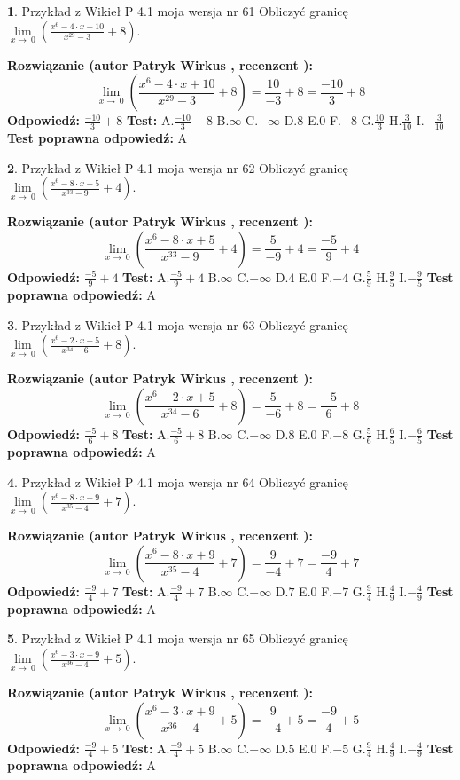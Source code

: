 \documentclass[12pt, a4paper]{article}
\theoremstyle{definition} %
\newtheorem{zad}{}
\newcommand{\zadStart}[1]{\begin{zad}#1\newline}
\newcommand{\zadStop}{\end{zad}}
\newcommand{\rozwStart}[2]{\noindent \textbf{Rozwiązanie (autor #1 , recenzent #2): }\newline}
\newcommand{\rozwStop}{\newline}
\newcommand{\odpStart}{\noindent \textbf{Odpowiedź:}\newline}
\newcommand{\odpStop}{\newline}
\newcommand{\testStart}{\noindent \textbf{Test:}\newline}
\newcommand{\testStop}{\newline}
\newcommand{\kluczStart}{\noindent \textbf{Test poprawna odpowiedź:}\newline}
\newcommand{\kluczStop}{\newline}
\begin{document}
\zadStart{Przykład z Wikieł P 4.1 moja wersja nr 61}
Obliczyć granicę $\lim\limits_{x\to\ 0}(\frac{x^{6}-4 \cdot x +10}{x^{29}-3}+8)$.
\zadStop
\rozwStart{Patryk Wirkus}{}
$$\lim\limits_{x\to\ 0}(\frac{x^{6}-4 \cdot x +10}{x^{29}-3}+8)=\frac{10}{-3}+8=\frac{-10}{3}+8$$
\rozwStop
\odpStart
$\frac{-10}{3}+8$
\odpStop
\testStart
A.$\frac{-10}{3}+8$
B.$\infty$
C.$-\infty$
D.$8$
E.$0$
F.$-8$
G.$\frac{10}{3}$
H.$\frac{3}{10}$
I.$-\frac{3}{10}$
\testStop
\kluczStart
A
\kluczStop



\zadStart{Przykład z Wikieł P 4.1 moja wersja nr 62}
Obliczyć granicę $\lim\limits_{x\to\ 0}(\frac{x^{6}-8 \cdot x +5}{x^{33}-9}+4)$.
\zadStop
\rozwStart{Patryk Wirkus}{}
$$\lim\limits_{x\to\ 0}(\frac{x^{6}-8 \cdot x +5}{x^{33}-9}+4)=\frac{5}{-9}+4=\frac{-5}{9}+4$$
\rozwStop
\odpStart
$\frac{-5}{9}+4$
\odpStop
\testStart
A.$\frac{-5}{9}+4$
B.$\infty$
C.$-\infty$
D.$4$
E.$0$
F.$-4$
G.$\frac{5}{9}$
H.$\frac{9}{5}$
I.$-\frac{9}{5}$
\testStop
\kluczStart
A
\kluczStop



\zadStart{Przykład z Wikieł P 4.1 moja wersja nr 63}
Obliczyć granicę $\lim\limits_{x\to\ 0}(\frac{x^{6}-2 \cdot x +5}{x^{34}-6}+8)$.
\zadStop
\rozwStart{Patryk Wirkus}{}
$$\lim\limits_{x\to\ 0}(\frac{x^{6}-2 \cdot x +5}{x^{34}-6}+8)=\frac{5}{-6}+8=\frac{-5}{6}+8$$
\rozwStop
\odpStart
$\frac{-5}{6}+8$
\odpStop
\testStart
A.$\frac{-5}{6}+8$
B.$\infty$
C.$-\infty$
D.$8$
E.$0$
F.$-8$
G.$\frac{5}{6}$
H.$\frac{6}{5}$
I.$-\frac{6}{5}$
\testStop
\kluczStart
A
\kluczStop



\zadStart{Przykład z Wikieł P 4.1 moja wersja nr 64}
Obliczyć granicę $\lim\limits_{x\to\ 0}(\frac{x^{6}-8 \cdot x +9}{x^{35}-4}+7)$.
\zadStop
\rozwStart{Patryk Wirkus}{}
$$\lim\limits_{x\to\ 0}(\frac{x^{6}-8 \cdot x +9}{x^{35}-4}+7)=\frac{9}{-4}+7=\frac{-9}{4}+7$$
\rozwStop
\odpStart
$\frac{-9}{4}+7$
\odpStop
\testStart
A.$\frac{-9}{4}+7$
B.$\infty$
C.$-\infty$
D.$7$
E.$0$
F.$-7$
G.$\frac{9}{4}$
H.$\frac{4}{9}$
I.$-\frac{4}{9}$
\testStop
\kluczStart
A
\kluczStop



\zadStart{Przykład z Wikieł P 4.1 moja wersja nr 65}
Obliczyć granicę $\lim\limits_{x\to\ 0}(\frac{x^{6}-3 \cdot x +9}{x^{36}-4}+5)$.
\zadStop
\rozwStart{Patryk Wirkus}{}
$$\lim\limits_{x\to\ 0}(\frac{x^{6}-3 \cdot x +9}{x^{36}-4}+5)=\frac{9}{-4}+5=\frac{-9}{4}+5$$
\rozwStop
\odpStart
$\frac{-9}{4}+5$
\odpStop
\testStart
A.$\frac{-9}{4}+5$
B.$\infty$
C.$-\infty$
D.$5$
E.$0$
F.$-5$
G.$\frac{9}{4}$
H.$\frac{4}{9}$
I.$-\frac{4}{9}$
\testStop
\kluczStart
A
\kluczStop
\end{document}
